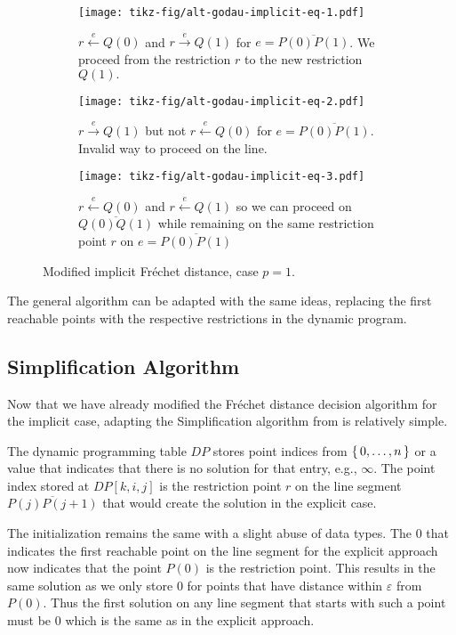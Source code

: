 \begin{figure}
    \centering
    \begin{subfigure}[t]{0.3\textwidth}
      \texttt{[image: tikz-fig/alt-godau-implicit-eq-1.pdf]}
      \caption{\(r \overset e\leftarrow Q(0)\) and \(r \overset e\rightarrow Q(1)\) for \(e = \overline{P(0)P(1)}\). We proceed from the restriction \(r\) to the new restriction \(Q(1).\)}
    \end{subfigure}
    \begin{subfigure}[t]{0.3\textwidth}
      \texttt{[image: tikz-fig/alt-godau-implicit-eq-2.pdf]}
      \caption{\(r \overset e\rightarrow Q(1)\) but not \(r \overset e\leftarrow Q(0)\) for \(e = \overline{P(0)P(1)}\). Invalid way to proceed on the line.}
    \end{subfigure}
    \begin{subfigure}[t]{0.3\textwidth}
      \texttt{[image: tikz-fig/alt-godau-implicit-eq-3.pdf]}
      \caption{\(r \overset e\leftarrow Q(0)\) and \(r \overset e\leftarrow Q(1)\) so we can proceed on \(\overline{Q(0)Q(1)}\) while remaining on the same restriction point \(r\) on \(e = \overline{P(0)P(1)}\)}
    \end{subfigure}

    \caption{Modified implicit Fréchet distance, case \(p = 1\).}
    \label{fig:alt_godau_implicit_eq}
\end{figure}

The general algorithm can be adapted with the same ideas, replacing the first reachable points with the respective restrictions in the dynamic program. 

\subsection{Simplification Algorithm}
Now that we have already modified the Fréchet distance decision algorithm for the implicit case, adapting the Simplification algorithm from \citeauthor{on_optimal_polyline_simplification_using_the_hausdorff_and_frechet_distance} is relatively simple. 

The dynamic programming table \(DP\) stores point indices from \(\set{0, \dots, n}\) or a value that indicates that there is no solution for that entry, e.g., \(\infty\). The point index stored at \(DP[k,i,j]\) is the restriction point \(r\) on the line segment \(\overline{P(j)P(j+1)}\) that would create the solution in the explicit case. 

The initialization remains the same with a slight abuse of data types. The \(0\) that indicates the first reachable point on the line segment for the explicit approach now indicates that the point \(P(0)\) is the restriction point. This results in the same solution as we only store \(0\) for points that have distance within \(\varepsilon\) from \(P(0)\). Thus the first solution on any line segment that starts with such a point must be \(0\) which is the same as in the explicit approach.

